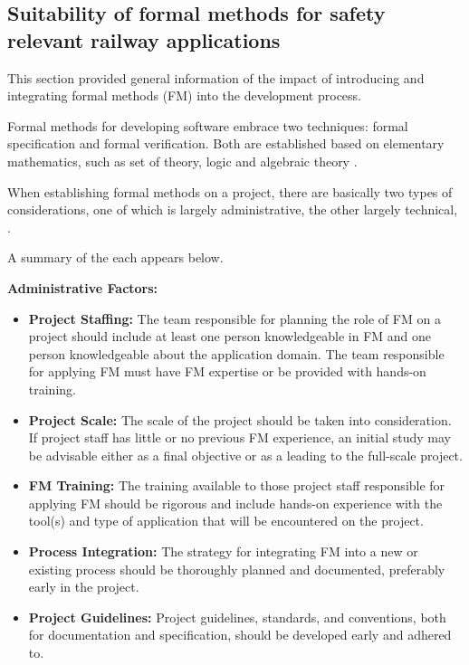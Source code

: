 \documentclass{template/openetcs_report}
\begin{document}
\subsection{Suitability of formal methods for safety relevant railway applications}
This section provided general information of the impact of introducing and integrating formal methods (FM) into the development process.

Formal methods for developing software embrace two techniques: formal specification and formal verification. Both are established based on elementary mathematics, such as set of theory, logic and algebraic theory \cite{SOFL-doc}.

When establishing formal methods on a project, there are basically two types of considerations, one of which is largely administrative, the other largely technical, \cite{FM-doc}. 

A summary of the each appears below.

\textbf{Administrative Factors:}
\begin{itemize}\itemsep=0pt
  \item \textbf{Project Staffing:} The team responsible for planning the role of FM on a project should include at least one person knowledgeable in FM and one person knowledgeable about the application domain. The team responsible for applying FM must have FM expertise or be provided with hands-on training.
  \item \textbf{Project Scale:} The scale of the project should be taken into consideration. If project staff has little or no previous FM experience, an initial study may be advisable either as a final objective or as a leading to the full-scale project.
  \item \textbf{FM Training:} The training available to those project staff responsible for applying FM should be rigorous and include hands-on experience with the tool(s) and type of application that will be encountered on the project.
  \item \textbf{Process Integration:} The strategy for integrating FM into a new or existing process should be thoroughly planned and documented, preferably early in the project.
  \item \textbf{Project Guidelines:} Project guidelines, standards, and conventions, both for documentation and specification, should be developed early and adhered to.
\end{itemize}
\end{document}

